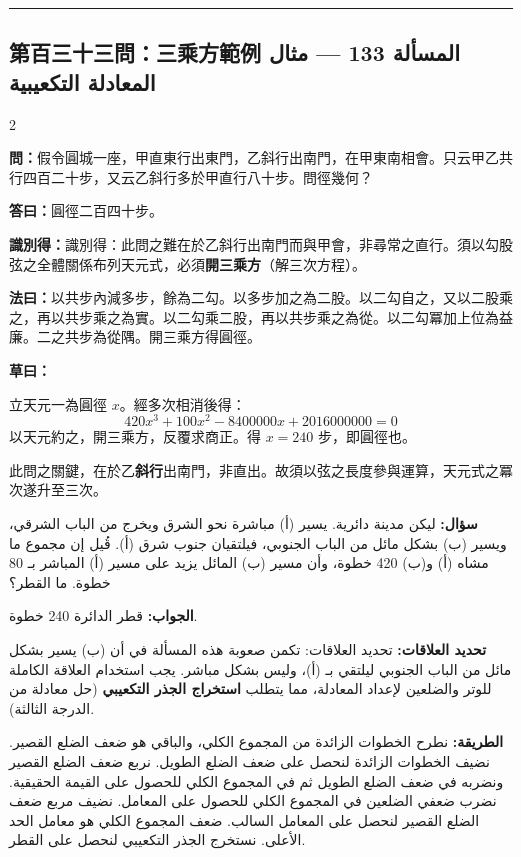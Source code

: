 \documentclass[11pt,a4paper]{article}
\newcommand{\ar}[1]{\arabicfont\beginR #1\endR}
\newcommand{\arb}[1]{\textbf{\arabicfont\beginR #1\endR}}
\newcommand{\longline}{\noindent\rule{\textwidth}{0.4pt}}
\newcommand{\arnote}[1]{\textcolor{arabicblue}{\ar{#1}}}
\newcommand{\wen}[1]{\par\noindent\textbf{\textcolor{probcolor}{問：}}{#1}\par}
\newcommand{\da}[1]{\par\noindent\textbf{\textcolor{anscolor}{答曰：}}{#1}\par}
\newcommand{\fayue}[1]{\par\noindent\textbf{\textcolor{methodcolor}{法曰：}}{#1}\par}
\newcommand{\caoyue}[1]{\par\noindent\textbf{草曰：}{#1}\par}
\newcommand{\zhi}[1]{\par\noindent\textbf{識別得：}{#1}\par}
\newcommand{\arwen}[1]{\par\noindent\arb{سؤال: }\arnote{#1}\par}
\newcommand{\arjwb}[1]{\par\noindent\arb{الجواب: }\arnote{#1}\par}
\newcommand{\arqwd}[1]{\par\noindent\arb{الطريقة: }\arnote{#1}\par}
\newcommand{\arfl}[1]{\par\noindent\arb{تحديد العلاقات: }\arnote{#1}\par}
\begin{document}
\vspace{0.3cm}
\longline

\subsection*{第百三十三問：三乘方範例 \hfill \ar{المسألة 133 — مثال المعادلة التكعيبية}}

\begin{paracol}{2}

\begin{leftcolumn}
\wen{假令圓城一座，甲直東行出東門，乙斜行出南門，在甲東南相會。只云甲乙共行四百二十步，又云乙斜行多於甲直行八十步。問徑幾何？}

\da{圓徑二百四十步。}

\zhi{識別得：此問之難在於乙斜行出南門而與甲會，非尋常之直行。須以勾股弦之全體關係布列天元式，必須\textbf{開三乘方}（解三次方程）。}

\fayue{以共步內減多步，餘為二勾。以多步加之為二股。以二勾自之，又以二股乘之，再以共步乘之為實。以二勾乘二股，再以共步乘之為從。以二勾冪加上位為益廉。二之共步為從隅。開三乘方得圓徑。}

\caoyue{
立天元一為圓徑 $x$。經多次相消後得：
$$420x^3 + 100x^2 - 8400000x + 2016000000 = 0$$
以天元約之，開三乘方，反覆求商正。得 $x = 240$ 步，即圓徑也。

此問之關鍵，在於乙\textbf{斜行}出南門，非直出。故須以弦之長度參與運算，天元式之冪次遂升至三次。}
\end{leftcolumn}

\begin{rightcolumn}
\arwen{ليكن مدينة دائرية. يسير (أ) مباشرة نحو الشرق ويخرج من الباب الشرقي، ويسير (ب) بشكل مائل من الباب الجنوبي، فيلتقيان جنوب شرق (أ). قُيل إن مجموع ما مشاه (أ) و(ب) 420 خطوة، وأن مسير (ب) المائل يزيد على مسير (أ) المباشر بـ 80 خطوة. ما القطر؟}

\arjwb{قطر الدائرة 240 خطوة.}

\arfl{تحديد العلاقات: تكمن صعوبة هذه المسألة في أن (ب) يسير بشكل مائل من الباب الجنوبي ليلتقي بـ (أ)، وليس بشكل مباشر. يجب استخدام العلاقة الكاملة للوتر والضلعين لإعداد المعادلة، مما يتطلب \textbf{استخراج الجذر التكعيبي} (حل معادلة من الدرجة الثالثة).}

\arqwd{نطرح الخطوات الزائدة من المجموع الكلي، والباقي هو ضعف الضلع القصير. نضيف الخطوات الزائدة لنحصل على ضعف الضلع الطويل. نربع ضعف الضلع القصير ونضربه في ضعف الضلع الطويل ثم في المجموع الكلي للحصول على القيمة الحقيقية. نضرب ضعفي الضلعين في المجموع الكلي للحصول على المعامل. نضيف مربع ضعف الضلع القصير لنحصل على المعامل السالب. ضعف المجموع الكلي هو معامل الحد الأعلى. نستخرج الجذر التكعيبي لنحصل على القطر.}


\end{rightcolumn}
\end{paracol}
\end{document}
